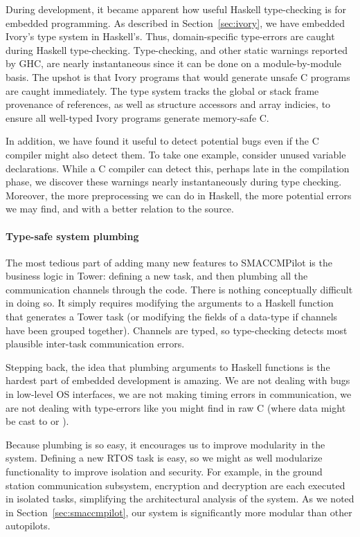 During development, it became apparent how useful Haskell type-checking
is for embedded programming.  As described in Section~\ref{sec:ivory}, we
have embedded Ivory's type system in Haskell's.  Thus, domain-specific
type-errors are caught during Haskell type-checking.  Type-checking, and other
static warnings reported by GHC, are nearly instantaneous
since it can be done on a module-by-module basis.  The upshot is that Ivory
programs that would generate unsafe C programs are caught immediately.
The type system tracks the global or stack frame provenance of
references, as well as structure accessors and array indicies, to ensure
all well-typed Ivory programs generate memory-safe C.

In addition, we have found it useful to detect potential bugs even if the C
compiler might also detect them.  To take one example, consider unused variable
declarations.  While a C compiler can detect this, perhaps late in the
compilation phase, we discover these warnings nearly instantaneously during type
checking.  Moreover, the more preprocessing we can do in Haskell, the more
potential errors we may find, and with a better relation to the source.

\paragraph{Type-safe system plumbing}
The most tedious part of adding many new features to SMACCMPilot is the business
logic in Tower: defining a new task, and then plumbing all the communication
channels through the code.  There is nothing conceptually difficult in doing so.
It simply requires modifying the arguments to a Haskell function that generates
a Tower task (or modifying the fields of a data-type if channels have been
grouped together).  Channels are typed, so type-checking detects most plausible
inter-task communication errors.

Stepping back, the idea that plumbing arguments to Haskell functions is the
hardest part of embedded development is amazing.  We are not dealing with bugs
in low-level OS interfaces, we are not making timing errors in communication, we
are not dealing with type-errors like you might find in raw C (where data might
be cast to  or ).

Because plumbing is so easy, it encourages us to improve modularity in the
system.  Defining a new RTOS task is easy, so we might as well modularize
functionality to improve isolation and security.  For example, in the ground
station communication subsystem, encryption and decryption are each executed in
isolated tasks, simplifying the architectural analysis of the system.  As
we noted in Section~\ref{sec:smaccmpilot}, our system is significantly more
modular than other autopilots.

